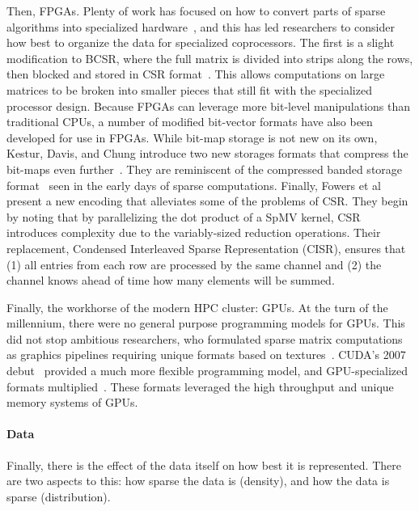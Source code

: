 Then, FPGAs.
Plenty of work has focused on how to convert parts of sparse algorithms into specialized hardware~\cite{elgindy2002sparse,zhuo2005sparse,gregg2007fpga,prasanna2007sparse,jain2020domain,kapre2009parallelizing}, and this has led researchers to consider how best to organize the data for specialized coprocessors. 
The first is a slight modification to BCSR, where the full matrix is divided into strips along the rows, then blocked and stored in CSR format~\cite{sun2007sparse}. 
This allows computations on large matrices to be broken into smaller pieces that still fit with the specialized processor design.
Because FPGAs can leverage more bit-level manipulations than traditional CPUs, a number of modified bit-vector formats have also been developed for use in FPGAs. 
While bit-map storage is not new on its own, Kestur, Davis, and Chung introduce two new storages formats that compress the bit-maps even further~\cite{kestur2012towards}.
They are reminiscent of the compressed banded storage format~\cite{jennings1966compact} seen in the early days of sparse computations.
Finally, Fowers et al~\cite{fowers2014high} present a new encoding that alleviates some of the problems of CSR\@.
They begin by noting that by parallelizing the dot product of a SpMV kernel, CSR introduces complexity due to the variably-sized reduction operations.
Their replacement, Condensed Interleaved Sparse Representation (CISR), ensures that (1) all entries from each row are processed by the same channel and (2) the channel knows ahead of time how many elements will be summed.

Finally, the workhorse of the modern HPC cluster: GPUs.
At the turn of the millennium, there were no general purpose programming models for GPUs. 
This did not stop ambitious researchers, who formulated sparse matrix computations as graphics pipelines requiring unique formats based on textures~\cite{bolz2003sparse,fan2004gpu}.
CUDA's 2007 debut~\cite{cuda2007v1.0} provided a much more flexible programming model, and GPU-specialized formats multiplied~\cite{bell2009implementing,bell2008efficient,monakov2010automatically}.
These formats leveraged the high throughput and unique memory systems of GPUs.

\paragraph{Data}

Finally, there is the effect of the data itself on how best it is represented.
There are two aspects to this: how sparse the data is (density), and how the data is sparse (distribution).


